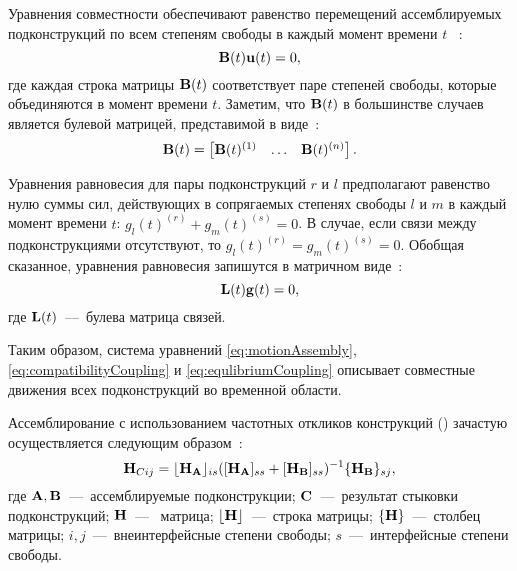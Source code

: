 Уравнения совместности обеспечивают равенство перемещений ассемблируемых подконструкций по всем степеням свободы в каждый момент времени $ t $ ~\cite{lib:coupling:Klerk}:
\begin{equation}
	\mathbf{B}(t) \mathbf{u}(t) = 0, \label{eq:compatibilityCoupling}
\end{equation}
где каждая строка матрицы $ \mathbf{B}(t) $ соответствует паре степеней свободы, которые объединяются в момент времени $ t $. Заметим, что $ \mathbf{B}(t) $ в большинстве случаев является булевой матрицей, представимой в виде~\cite{lib:coupling:Brunetti}:
\begin{equation}
	\mathbf{B}(t) = 
	\begin{bmatrix}
		\mathbf{B}(t) ^ {(1)} & \hdots & \mathbf{B}(t) ^ {(n)}
	\end{bmatrix}.
\end{equation}

Уравнения равновесия для пары подконструкций $ r $ и $ l $ предполагают равенство нулю суммы сил, действующих в сопрягаемых степенях свободы $ l $ и $ m $ в каждый момент времени $ t $: $ g_l(t)^{(r)} + g_m(t)^{(s)} = 0 $. В случае, если связи между подконструкциями отсутствуют, то $ g_l(t)^{(r)} = g_m(t)^{(s)} = 0 $. Обобщая сказанное, уравнения равновесия запишутся в матричном виде~\cite{lib:coupling:Klerk}:
\begin{equation}
	\mathbf{L}(t) \mathbf{g} (t) = 0, \label{eq:equlibriumCoupling}
\end{equation}
где $ \mathbf{L}(t) $~---~булева матрица связей.

Таким образом, система уравнений \eqref{eq:motionAssembly}, \eqref{eq:compatibilityCoupling} и \eqref{eq:equlibriumCoupling} описывает совместные движения всех подконструкций во временной области.

Ассемблирование с использованием частотных откликов конструкций () зачастую осуществляется следующим образом~\cite{lib:coupling:Gialamas1996}:
\begin{equation}
	\mathbf{H}_{Cij} = \lfloor \mathbf{H}_{\mathbf{A}} \rfloor_{is} ([\mathbf{H}_{\mathbf{A}}]_{ss} + [\mathbf{H}_{\mathbf{B}}]_{ss})^{-1} \{ \mathbf{H}_{\mathbf{B}} \}_{sj},
\end{equation}
где $\mathbf{A}, \mathbf{B}$~---~ассемблируемые подконструкции; $\mathbf{C}$~---~результат стыковки подконструкций; $\mathbf{H}$~---~ матрица; $\lfloor \mathbf{H} \rfloor$~---~строка  матрицы; $\{ \mathbf{H} \}$~---~столбец  матрицы; $ i, j $~---~внеинтерфейсные степени свободы; $ s $~---~интерфейсные степени свободы.

